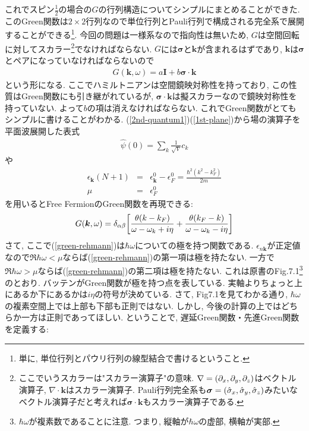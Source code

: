 \documentclass[10.5pt,a4paper]{jreport}
\newcommand{\bk}{\bm{k}}
\newcommand{\hpsi}{\hat{\psi}}
\begin{document}
これでスピン$\frac{1}{2}$の場合の$G$の行列構造についてシンプルにまとめることができた. このGreen関数は$2\times2$行列なので単位行列とPauli行列で構成される完全系で展開することができる\footnote{単に, 単位行列とパウリ行列の線型結合で書けるということ.}. 今回の問題は一様系なので指向性は無いため, $G$は空間回転に対してスカラー\footnote{ここでいうスカラーは"スカラー演算子"の意味. $\nabla = \qty(\partial_x, \partial_y, \partial_z)$はベクトル演算子, $\nabla\cdot\bk$はスカラー演算子. Pauli行列完全系も$\bm{\sigma} = \qty(\hat{\sigma}_x, \hat{\sigma}_y, \hat{\sigma}_z)$みたいなベクトル演算子だと考えれば$\bm{\sigma}\cdot\bk$もスカラー演算子である. }でなければならない. $G$には$\bm{\sigma}$と$\bk$が含まれるはずであり, $\bk$は$\bm{\sigma}$とペアになっていなければならないので
\begin{eqnarray}
  G(\bk, \omega) = a\bm{I} + b\bm{\sigma}\cdot\bk
\end{eqnarray}
という形になる. ここでハミルトニアンは空間鏡映対称性を持っており, この性質はGreen関数にも引き継がれているが, $\bm{\sigma}\cdot\bk$は擬スカラーなので鏡映対称性を持っていない. よって$b$の項は消えなければならない. これでGreen関数がとてもシンプルに書けることがわかる. (\ref{2nd-quantum1})(\ref{1st-plane})から場の演算子を平面波展開した表式
\begin{eqnarray}
  \hpsi(0) = \sum_k\frac{1}{\sqrt{V}}c_k
\end{eqnarray}
や
\begin{eqnarray}
  \epsilon_{\bk}(N+1) &=& \epsilon_{\bk}^0 - \epsilon_F^0 = \frac{\hbar^2(k^2 - k_F^2)}{2m}\\
  \mu &=& \epsilon_F^0
\end{eqnarray}
を用いるとFree FermionのGreen関数を再現できる:
\begin{eqnarray}
  G(\bk, \omega) = \delta_{\alpha\beta}\qty[\frac{\theta(k-k_F)}{\omega - \omega_k + i\eta} + \frac{\theta(k_F-k)}{\omega - \omega_k - i\eta}]
\end{eqnarray}
さて, ここで(\ref{green-rehmann})は$\hbar\omega$についての極を持つ関数である. $\epsilon_{n\bk}$が正定値なので$\Re\hbar\omega < \mu$ならば(\ref{green-rehmann})の第一項は極を持たない. 一方で$\Re\hbar\omega > \mu$ならば(\ref{green-rehmann})の第二項は極を持たない. これは原書のFig.7.1\footnote{$\hbar\omega$が複素数であることに注意. つまり, 縦軸が$\hbar\omega$の虚部, 横軸が実部.}のとおり. バッテンがGreen関数が極を持つ点を表している. 実軸よりちょっと上にあるか下にあるかは$i\eta$の符号が決めている. さて, Fig7.1を見てわかる通り, $\hbar\omega$の複素空間上では上部も下部も正則ではない. しかし, 今後の計算の上ではどちらか一方は正則であってほしい. ということで, 遅延Green関数・先進Green関数を定義する:
\end{document}
